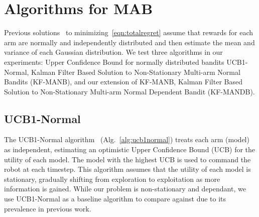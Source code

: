 \section{Algorithms for MAB}
\label{sec:bandit_algorithms}

Previous solutions~\cite{Auer2002,Granmo2010} to minimizing~\eqref{eqn:totalregret} assume that rewards for each arm are normally and independently distributed and then estimate the mean and variance of each Gaussian distribution.  We test three algorithms in our experiments: Upper Confidence Bound for normally distributed bandits UCB1-Normal, Kalman Filter Based Solution to Non-Stationary Multi-arm Normal Bandits (KF-MANB), and our extension of KF-MANB, Kalman Filter Based Solution to Non-Stationary Multi-arm Normal Dependent Bandit (KF-MANDB).



\subsection{UCB1-Normal}
The UCB1-Normal algorithm~\cite{Auer2002} (Alg.~\ref{alg:ucb1normal}) treats each arm (model) as independent, estimating an optimistic Upper Confidence Bound (UCB) for the utility of each model. The model with the highest UCB is used to command the robot at each timestep. This algorithm assumes that the utility of each model is stationary, gradually shifting from exploration to exploitation as more information is gained. While our problem is non-stationary and dependant, we use UCB1-Normal as a baseline algorithm to compare against due to its prevalence in previous work.

